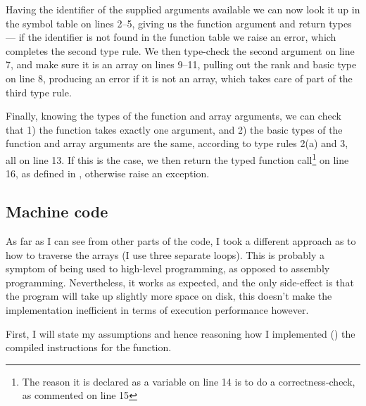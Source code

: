 Having the identifier of the supplied arguments available we can now look it
up in the symbol table on lines 2--5, giving us the function argument and
return types --- if the identifier is not found in the function table we raise
an error, which completes the second type rule. We then type-check the second
argument on line 7, and make sure it is an array on lines 9--11, pulling out
the rank and basic type on line 8, producing an error if it is not an array,
which takes care of part of the third type rule.

Finally, knowing the types of the function and array arguments, we can check
that 1) the function takes exactly one argument, and 2) the basic types of the
function and array arguments are the same, according to type rules 2(a) and 3,
all on line 13. If this is the case, we then return the typed 
function call\footnote{The reason it is declared as a variable on line 14 is
to do a correctness-check, as commented on line 15} on line 16, as defined in
, otherwise raise an exception.

\newpage
\subsection{Machine code}
\label{sec:map|sub:machinecode}
As far as I can see from other parts of the code, I took a different approach
as to how to traverse the arrays (I use three separate loops). This is
probably a symptom of being used to high-level programming, as opposed to
assembly programming. Nevertheless, it works as expected, and the only
side-effect is that the program will take up slightly more space on disk, this
doesn't make the implementation inefficient in terms of execution performance
however.

First, I will state my assumptions and hence reasoning how I implemented
() the compiled instructions for
the  function.

